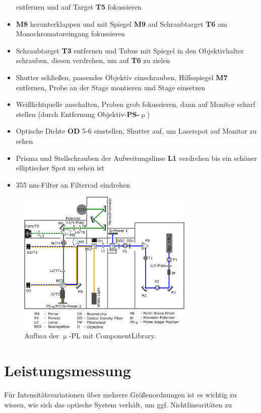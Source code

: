\begin{itemize}
entfernen und auf Target \textbf{T5} fokussieren \item \textbf{M8}
herunterklappen und mit Spiegel \textbf{M9} auf Schraubtarget \textbf{T6} am
Monochromatoreingang fokussieren \item Schraubtarget \textbf{T3} entfernen und
Tubus mit Spiegel in den Objektivhalter schrauben, diesen verdrehen, um auf
\textbf{T6} zu zielen \item Shutter schließen, passendes Objektiv einschrauben,
Hilfsspiegel \textbf{M7} entfernen, Probe an der Stage montieren und Stage
einsetzen \item Weißlichtquelle anschalten, Proben grob fokussieren, dann auf
Monitor scharf stellen (durch Entfernung Objektiv-\textbf{PS-$\upmu$}) \item
Optische Dichte \textbf{OD} 5-6 einstellen, Shutter auf, um Laserspot auf
Monitor zu sehen \item Prisma und Stellschrauben der Aufweitungslinse
\textbf{L1} verdrehen bis ein schöner elliptischer Spot zu sehen ist \item 355
nm-Filter an Filterrad eindrehen \end{itemize} \begin{figure}[h] \centering
\includegraphics[width=0.75\textwidth]{Bilder/Anhang/justage} \caption[Justage
$\upmu$-PL]{Aufbau der $\upmu$-PL mit ComponentLibrary\cite{lib}.} \end{figure}
\label{JustImg} \newpage \section{Leistungsmessung} \label{Leistmess} Für
Intensitätsvariationen über mehrere Größenordnungen ist es wichtig zu wissen,
wie sich das optische System verhält, um ggf. Nichtlinearitäten zu
